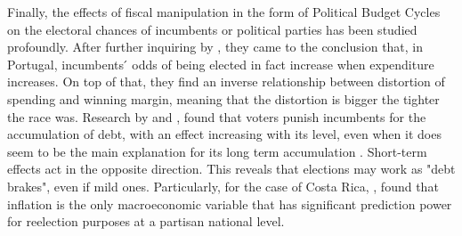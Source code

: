 Finally, the effects of fiscal manipulation in the form of Political Budget Cycles on the electoral chances of incumbents or political parties has been studied profoundly. After further inquiring by \textcite{aidt2011}, they came to the conclusion that, in Portugal, incumbents ́ odds of being elected in fact increase when expenditure increases. On top of that, they find an inverse relationship between distortion of spending and winning margin, meaning that the distortion is bigger the tighter the race was. Research by \textcite{drazen2010} and \textcite{cassette2014}, found that voters punish incumbents for the accumulation of debt, with an effect increasing with its level, even when it does seem to be the main explanation for its long term accumulation \parencite{alesina2016}. Short-term effects act in the opposite direction. This reveals that elections may work as "debt brakes", even if mild ones. Particularly, for the case of Costa Rica, \textcite{hernandez2014}, found that inflation is the only macroeconomic variable that has significant prediction power for reelection purposes at a partisan national level. 

